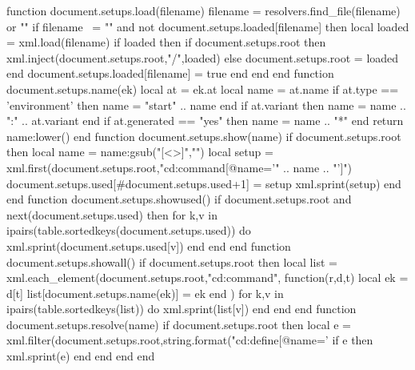         function document.setups.load(filename)
            filename = resolvers.find_file(filename) or ""
            if filename ~= "" and not document.setups.loaded[filename] then
                local loaded = xml.load(filename)
                if loaded then
                    if document.setups.root then
                        xml.inject(document.setups.root,"/",loaded)
                    else
                        document.setups.root = loaded
                    end
                    document.setups.loaded[filename] = true
                end
            end
        end
        function document.setups.name(ek)
            local at = ek.at
            local name = at.name
            if at.type == 'environment' then
                name = "start" .. name
            end
            if at.variant then
                name = name .. ":" .. at.variant
            end
            if at.generated == "yes" then
                name = name .. "*"
            end
            return name:lower()
        end
        function document.setups.show(name)
            if document.setups.root then
                local name = name:gsub("[<>]","")
                local setup = xml.first(document.setups.root,"cd:command[@name='" .. name .. "']")
                document.setups.used[#document.setups.used+1] = setup
                xml.sprint(setup)
            end
        end
        function document.setups.showused()
            if document.setups.root and next(document.setups.used) then
                for k,v in ipairs(table.sortedkeys(document.setups.used)) do
                    xml.sprint(document.setups.used[v])
                end
            end
        end
        function document.setups.showall()
            if document.setups.root then
                local list = { }
                xml.each_element(document.setups.root,"cd:command", function(r,d,t)
                    local ek = d[t]
                    list[document.setups.name(ek)] = ek
                end )
                for k,v in ipairs(table.sortedkeys(list)) do
                    xml.sprint(list[v])
                end
            end
        end
        function document.setups.resolve(name)
            if document.setups.root then
                local e = xml.filter(document.setups.root,string.format("cd:define[@name='%
                if e then
                    xml.sprint(e)
                end
            end
        end
    end
\stopluacode

\def\mkloadsetups    #1{\ctxlua{document.setups.load("#1")}}
\def\mkshowsetup     #1{\ctxlua{document.setups.show("#1")}}
\def\mkshowusedsetups  {\bgroup\enableXML\ctxlua{document.setups.showused()}\egroup}
\def\mkshowallsetups   {\bgroup\enableXML\ctxlua{document.setups.showall ()}\egroup}

\def\mkshowsetup     #1{\bgroup\enableXML\ctxlua{document.setups.show("#1")}\egroup}



\endinput
